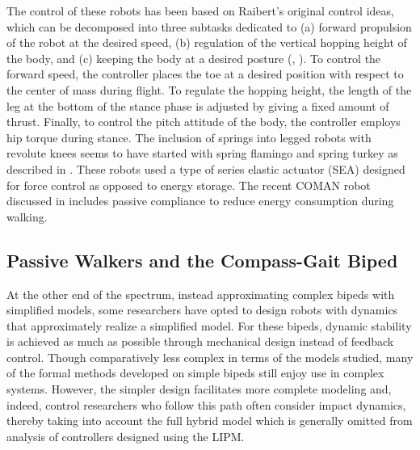 The control of these robots has been based on Raibert's original control ideas, which can be decomposed into three subtasks dedicated to (a) forward propulsion of the robot at the desired speed, (b) regulation of the vertical hopping height of the body, and (c) keeping the body at a desired posture (\cite{RAI84}, \cite[Chapter 2]{RA86a}).
%
To control the forward speed, the controller places the toe at a desired position with respect to the center of mass during flight.
%
To regulate the hopping height, the length of the leg at the bottom of the stance phase is adjusted by giving a fixed amount of thrust.
%
Finally, to control the pitch attitude of the body, the controller employs hip torque during stance.
%
The inclusion of springs into legged robots with revolute knees seems to have started with spring flamingo and spring turkey as described in \cite{HOHUBA92,PRPR99,PR00,PRCHTODIPR01}.
%
These robots used a type of series elastic actuator (SEA) designed for force control as opposed to energy storage. %
%
The recent COMAN robot discussed in \cite{robots_coman} includes passive compliance to reduce energy consumption during walking.


\subsection{Passive Walkers and the Compass-Gait Biped}


At the other end of the spectrum, instead approximating complex bipeds with simplified models, some researchers have opted to design robots with dynamics that approximately realize a simplified model.
%
For these bipeds, dynamic stability is achieved as much as possible through mechanical design instead of feedback control.
%
Though comparatively less complex in terms of the models studied, many of the formal methods developed on simple bipeds still enjoy use in complex systems.
%
However, the simpler design facilitates more complete modeling and, indeed, control researchers who follow this path often consider impact dynamics, thereby taking into account the full hybrid model which is generally omitted from analysis of controllers designed using the LIPM.
%

